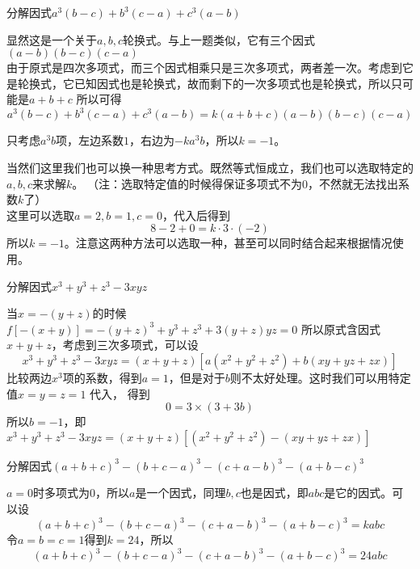 \documentclass[windows,csize4,answers]{BHCexam}
\begin{document}
\begin{groups}
\begin{questions}[]
\begin{solution}{0.5cm}
        \end{solution}
        \vspace{3.5cm}

        \question[5] 分解因式$a^3(b-c)+b^3(c-a)+c^3(a-b)$
        \begin{solution}{0.5cm}
            \methodonly 显然这是一个关于$a,b,c$轮换式。与上一题类似，它有三个因式$(a-b)(b-c)(c-a)$ \\
            由于原式是四次多项式，而三个因式相乘只是三次多项式，两者差一次。考虑到它是轮换式，它已知因式也是轮换式，故而剩下的一次多项式也是轮换式，所以只可能是$a+b+c$
            所以可得
            \[
                a^3(b-c)+b^3(c-a)+c^3(a-b)= k(a+b+c)(a-b)(b-c)(c-a)
            \]

            只考虑$a^3b$项，左边系数$1$，右边为$-ka^3b$，所以$k=-1$。

            当然们这里我们也可以换一种思考方式。既然等式恒成立，我们也可以选取特定的$a,b,c$来求解$k$。
            （注：选取特定值的时候得保证多项式不为0，不然就无法找出系数$k$了） \\
            这里可以选取$a=2,b=1,c=0$，代入后得到
            \[
                8-2+0=k\cdot 3  \cdot (-2)
            \]
            所以$k=-1$。注意这两种方法可以选取一种，甚至可以同时结合起来根据情况使用。
        \end{solution}
        \vspace{3.5cm}

        \question[5] 分解因式$x^3+y^3+z^3-3xyz$
        \begin{solution}{0.5cm}
            \methodonly 当$x=-(y+z)$的时候$f[-(x+y)]=-(y+z)^3+y^3+z^3+3(y+z)yz=0$
            所以原式含因式$x+y+z$，考虑到三次多项式，可以设
            \[
                x^3+y^3+z^3-3xyz=(x+y+z)[a(x^2+y^2+z^2)+b(xy+yz+zx)]
            \]
            比较两边$x^3$项的系数，得到$a=1$，但是对于$b$则不太好处理。这时我们可以用特定值$x=y=z=1$ 代入，
            得到
            \[
                0=3\times (3+3b)
            \]
            所以$b=-1$，即$x^3+y^3+z^3-3xyz=(x+y+z)[(x^2+y^2+z^2)-(xy+yz+zx)]$

        \end{solution}
        \vspace{3.5cm}

        \question[5] 分解因式$(a+b+c)^3-(b+c-a)^3-(c+a-b)^3-(a+b-c)^3$
        \begin{solution}{0.5cm}
            \methodonly $a=0$时多项式为$0$，所以$a$是一个因式，同理$b,c$也是因式，即$abc$是它的因式。可以设
            \[
                (a+b+c)^3-(b+c-a)^3-(c+a-b)^3-(a+b-c)^3=kabc
            \]
            令$a=b=c=1$得到$k=24$，所以
            \[
                (a+b+c)^3-(b+c-a)^3-(c+a-b)^3-(a+b-c)^3=24abc
            \]
        \end{solution}
        \vspace{3.5cm}


\end{questions}
\end{groups}
\end{document}
